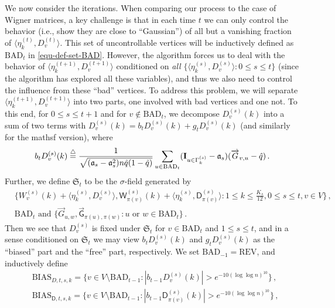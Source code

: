 \documentclass[11pt]{article}
\numberwithin{equation}{section}
\begin{document}
We now consider the iterations. When comparing our process to the case of Wigner matrices, a key challenge is that in each time $t$ we can only control the behavior (i.e., show they are close to ``Gaussian'') of all but a vanishing fraction of $\langle \eta^{(t)}_k, D^{(t)}_v \rangle$. This set of uncontrollable vertices will be inductively defined as $\mathrm{BAD}_{t}$ in \eqref{equ-def-set-BAD}. However, the algorithm forces us to deal with the behavior of $\langle \eta^{(t+1)}_k, D^{(t+1)}_v \rangle$ conditioned on \emph{all} $\{ \langle \eta^{(s)}_k, D^{(s)}_v \rangle : 0 \leq s \leq t \}$ (since the algorithm has explored all these variables), and thus we also need to control the influence from these ``bad'' vertices. To address this problem, we will separate $\langle \eta^{(t+1)}_k, D^{(t+1)}_v \rangle$ into two parts, one involved with bad vertices and one not. To this end,
for $0\leq s \leq t+1$ and  for $v \not \in \mathrm{BAD}_t$,  we decompose $D^{(s)}_v (k)$ into a sum of two terms with $D^{(s)}_v (k) = b_t{D}^{(s)}_v (k) + g_t{D}^{(s)}_v (k)$ (and similarly for the mathsf version), where 
\begin{align*}
     b_t{D}^{(s)}_v(k) \overset{\triangle}{=} \frac{1}{\sqrt{(\mathfrak{a}_s-\mathfrak{a}_s^2)n \Hat{q}(1-\Hat{q})}} \sum_{u \in \mathrm{BAD}_t} (\mathbf{I}_{u \in \Gamma^{(s)}_k} - \mathfrak{a}_s) (\overrightarrow{G}_{v,u}-\Hat{q})  \,.
\end{align*}
Further, we define $\mathfrak{S}_{t}$ to be the $\sigma$-field generated by
\begin{equation}\label{eq-def-mathfrak-S-t}
\begin{aligned}
    & \{ W^{(s)}_v(k) + \langle \eta^{(s)}_k,D^{(s)}_v \rangle, \mathsf{W}^{(s)}_{ \pi(v) }(k) + \langle \eta^{(s)}_k,\mathsf{D}^{(s)}_{\pi(v)} \rangle : 1\leq k \leq \frac{K_s}{12}, 0 \leq s \leq t, v\in V \}\,,  \\
    &\mathrm{BAD}_t \mbox{ and } \{  \overrightarrow{G}_{u,w} , \overrightarrow{\mathsf{G}}_{\pi(u), \pi(w)} : u \mbox{ or } w \in \mathrm{BAD}_t \}   \,.
 \end{aligned}
\end{equation}
Then we see that $D_v^{(s)}$ is fixed under $\mathfrak S_t$ for $v\in \mathrm{BAD}_t$ and $1\leq s\leq t$, and in a sense conditioned on $\mathfrak S_t$ we may view $b_t{D}^{(s)}_v(k) $ and $g_t{D}^{(s)}_v(k)$ as the ``biased'' part and the ``free'' part, respectively. 
We set $\mathrm{BAD}_{-1} = \mathrm{REV}$, and inductively define 
\begin{equation}
    \begin{aligned}
        & \mathrm{BIAS}_{D,t,s,k} = \Big\{ v \in V \setminus \mathrm{BAD}_{t-1} : | b_{t-1}{D}^{(s)}_v (k) | > e^{ - 10 (\log \log n)^{10} } \Big\}   \,, \\
        & \mathrm{BIAS}_{\mathsf{D},t,s,k} = \Big\{ v \in V \setminus \mathrm{BAD}_{t-1} : | b_{t-1}\mathsf{D}^{(s)}_{\pi(v)} (k) | > e^{ - 10 (\log \log n)^{10} } \Big\} \,,
    \label{equ-def-set-BIAS}
    \end{aligned}
\end{equation}
\end{document}
